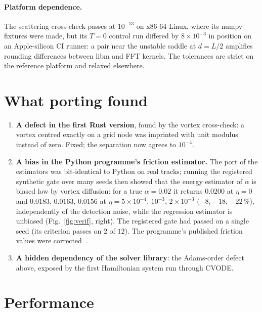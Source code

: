 \documentclass[11pt,a4paper]{article}
\begin{document}
\paragraph{Platform dependence.} The scattering cross-check passes at $10^{-13}$ on x86-64 Linux, where its numpy fixtures were made, but its $T=0$ control run differed by $8\times10^{-3}$ in position on an Apple-silicon CI runner: a pair near the unstable saddle at $d=L/2$ amplifies rounding differences between libm and FFT kernels. The tolerances are strict on the reference platform and relaxed elsewhere.

\section{What porting found}\label{sec:found}

\begin{enumerate}[nosep]
\item \textbf{A defect in the first Rust version}, found by the vortex cross-check: a vortex centred exactly on a grid node was imprinted with unit modulus instead of zero. Fixed; the separation now agrees to $10^{-4}$.
\item \textbf{A bias in the Python programme's friction estimator.} The port of the estimators was bit-identical to Python on real tracks; running the registered synthetic gate over many seeds then showed that the energy estimator of $\alpha$ is biased low by vortex diffusion: for a true $\alpha=0.02$ it returns $0.0200$ at $\eta=0$ and $0.0183$, $0.0163$, $0.0156$ at $\eta=5\times10^{-4}$, $10^{-3}$, $2\times10^{-3}$ ($-8$, $-18$, $-22\,\%$), independently of the detection noise, while the regression estimator is unbiased
(Fig.~\ref{fig:verif}, right). The registered gate had passed on a single seed (its criterion passes on $2$ of $12$). The programme's published friction values were corrected~\cite{Callens2026a,Callens2026b}.
\item \textbf{A hidden dependency of the solver library}: the Adams-order defect above, exposed by the first Hamiltonian system run through CVODE.
\end{enumerate}

\section{Performance}\label{sec:performance}
\end{document}
